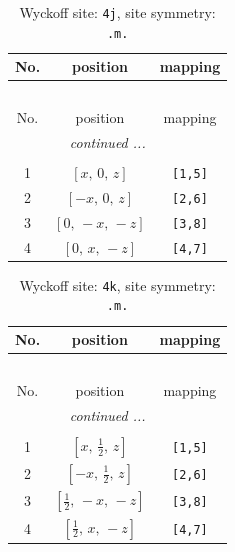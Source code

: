\documentclass[fleqn,8pt]{jsarticle}
\begin{document}
\renewcommand{\arraystretch}{1.2}
\begin{longtable}{ccc}
\caption{Wyckoff site: {\tt 4j}, site symmetry: {\tt .m.}}
 \\
 \hline \hline
No. & position & mapping \\ \hline \endfirsthead

\multicolumn{2}{l}{\tablename\ \thetable{}} \\
 \hline \hline
No. & position & mapping \\ \hline \endhead

 \hline \hline
\multicolumn{2}{r}{\footnotesize\it continued ...} \\ \endfoot

 \hline \hline
\multicolumn{2}{r}{} \\ \endlastfoot

1 & $\left[ x,\, 0,\, z \right]$ & {\tt [1,5]} \\ \hline
2 & $\left[ - x,\, 0,\, z \right]$ & {\tt [2,6]} \\ \hline
3 & $\left[ 0,\, - x,\, - z \right]$ & {\tt [3,8]} \\ \hline
4 & $\left[ 0,\, x,\, - z \right]$ & {\tt [4,7]} \\
\end{longtable}
\renewcommand{\arraystretch}{1.2}
\begin{longtable}{ccc}
\caption{Wyckoff site: {\tt 4k}, site symmetry: {\tt .m.}}
 \\
 \hline \hline
No. & position & mapping \\ \hline \endfirsthead

\multicolumn{2}{l}{\tablename\ \thetable{}} \\
 \hline \hline
No. & position & mapping \\ \hline \endhead

 \hline \hline
\multicolumn{2}{r}{\footnotesize\it continued ...} \\ \endfoot

 \hline \hline
\multicolumn{2}{r}{} \\ \endlastfoot

1 & $\left[ x,\, \frac{1}{2},\, z \right]$ & {\tt [1,5]} \\ \hline
2 & $\left[ - x,\, \frac{1}{2},\, z \right]$ & {\tt [2,6]} \\ \hline
3 & $\left[ \frac{1}{2},\, - x,\, - z \right]$ & {\tt [3,8]} \\ \hline
4 & $\left[ \frac{1}{2},\, x,\, - z \right]$ & {\tt [4,7]} \\
\end{longtable}
\end{document}
